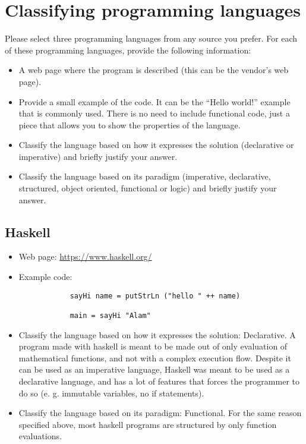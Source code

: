 \documentclass[]{article}
\begin{document}
    \setlength{\headheight}{23.10004pt}
    \addtolength{\topmargin}{-11.10004pt}    

    \section{Classifying programming languages}
    
    \noindent
    Please select three programming languages from any source you prefer. For each of these programming languages, 
    provide the following information:

    \begin{itemize}
    
        \item A web page where the program is described (this can be the vendor’s web page).
        \item Provide a small example of the code. It can be the “Hello world!” example that is commonly
        used. There is no need to include functional code, just a piece that allows you to show the
        properties of the language.
        \item Classify the language based on how it expresses the solution (declarative or imperative) and briefly
        justify your answer.
        \item  Classify the language based on its paradigm (imperative, declarative, structured, object oriented,
        functional or logic) and briefly justify your answer.
        
    \end{itemize}

    \subsection{Haskell}

    \begin{itemize}
    
        \item Web page: \url{https://www.haskell.org/}
        \item Example code:
        \begin{lstlisting}
            sayHi name = putStrLn ("hello " ++ name)

            main = sayHi "Alam"
        \end{lstlisting}

        \item Classify the language based on how it expresses the solution: 
            Declarative. A program made with haskell is meant to be made out of only evaluation of mathematical functions, and not with a complex execution flow. 
            Despite it can be used as an imperative language, Haskell was meant to be used as a declarative language, and has a lot of features that forces the programmer 
            to do so (e. g. immutable variables, no if statements). 
        \item  Classify the language based on its paradigm:
            Functional. For the same reason specified above, most haskell programs are structured by only function evaluations.
        
    \end{itemize}
\end{document}

